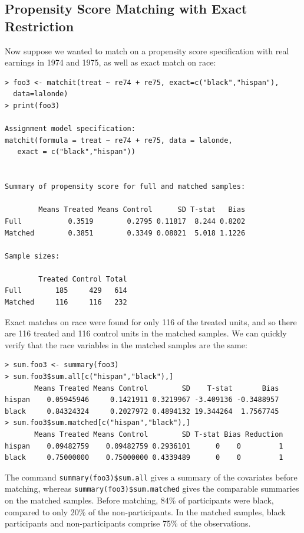 \documentclass[oneside,letterpaper,titlepage]{article}
\begin{document}
\subsection{Propensity Score Matching with Exact Restriction}

Now suppose we wanted to match on a propensity score specification
with real earnings in 1974 and 1975, as well as exact match on race:

\begin{verbatim}
> foo3 <- matchit(treat ~ re74 + re75, exact=c("black","hispan"),
  data=lalonde)
> print(foo3)
 
Assignment model specification:
matchit(formula = treat ~ re74 + re75, data = lalonde, 
   exact = c("black","hispan"))
 
 
Summary of propensity score for full and matched samples:
    
        Means Treated Means Control      SD T-stat   Bias
Full           0.3519        0.2795 0.11817  8.244 0.8202
Matched        0.3851        0.3349 0.08021  5.018 1.1226
 
Sample sizes:
 
        Treated Control Total
Full        185     429   614
Matched     116     116   232
\end{verbatim}

Exact matches on race were found for only 116 of the treated units,
and so there are 116 treated and 116 control units in the matched
samples.  We can quickly verify that the race variables in the matched
samples are the same:

\begin{verbatim}
> sum.foo3 <- summary(foo3)
> sum.foo3$sum.all[c("hispan","black"),]
       Means Treated Means Control        SD    T-stat       Bias
hispan    0.05945946     0.1421911 0.3219967 -3.409136 -0.3488957
black     0.84324324     0.2027972 0.4894132 19.344264  1.7567745
> sum.foo3$sum.matched[c("hispan","black"),]
       Means Treated Means Control        SD T-stat Bias Reduction
hispan    0.09482759    0.09482759 0.2936101      0    0         1
black     0.75000000    0.75000000 0.4339489      0    0         1
\end{verbatim}

The command {\tt summary(foo3)\$sum.all} gives a summary of the
covariates before matching, whereas {\tt summary(foo3)\$sum.matched}
gives the comparable summaries on the matched samples. Before
matching, 84\% of participants were black, compared to only 20\% of
the non-participants.  In the matched samples, black participants and
non-participants comprise 75\% of the observations.
\end{document}
